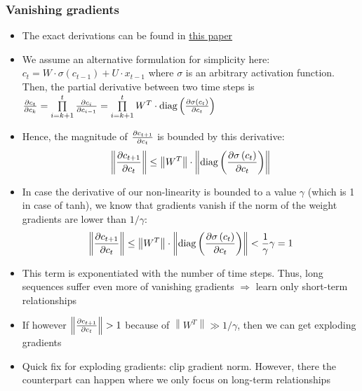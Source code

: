 \subsubsection{Vanishing gradients}
\begin{itemize}
	\item The exact derivations can be found in \href{http://proceedings.mlr.press/v28/pascanu13.pdf}{this paper}
	\item We assume an alternative formulation for simplicity here: $c_t = W \cdot \sigma(c_{t-1}) + U \cdot x_{t-1}$ where $\sigma$ is an arbitrary activation function. Then, the partial derivative between two time steps is\\ $\frac{\partial c_{t}}{\partial c_{k}} = \prod\limits_{i=k+1}^{t} \frac{\partial c_{i}}{\partial c_{i-1}} = \prod\limits_{i=k+1}^{t} W^T \cdot \text{diag}\left(\frac{\partial \sigma\left(c_t\right)}{\partial c_t}\right)$
	\item Hence, the magnitude of $\frac{\partial c_{t+1}}{\partial c_{t}}$ is bounded by this derivative: 
	$$\left\lVert \frac{\partial c_{t+1}}{\partial c_{t}}\right\rVert \leq \left\lVert W^T\right\rVert \cdot \left\lVert \text{diag}\left(\frac{\partial \sigma\left(c_t\right)}{\partial c_t}\right)\right\rVert$$
	\item In case the derivative of our non-linearity is bounded to a value $\gamma$ (which is 1 in case of tanh), we know that gradients vanish if the norm of the weight gradients are lower than $1/\gamma$:
	$$\left\lVert \frac{\partial c_{t+1}}{\partial c_{t}}\right\rVert \leq \left\lVert W^T\right\rVert \cdot \left\lVert \text{diag}\left(\frac{\partial \sigma\left(c_t\right)}{\partial c_t}\right)\right\rVert < \frac{1}{\gamma}\gamma = 1$$
	\item This term is exponentiated with the number of time steps. Thus, long sequences suffer even more of vanishing gradients $\Rightarrow$ learn only short-term relationships
	\item If however $\left\lVert \frac{\partial c_{t+1}}{\partial c_{t}}\right\rVert > 1$ because of $\left\lVert W^T\right\rVert \gg 1/\gamma$, then we can get exploding gradients
	\item Quick fix for exploding gradients: clip gradient norm. However, there the counterpart can happen where we only focus on long-term relationships
\end{itemize}
